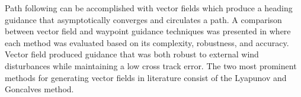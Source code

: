 \documentclass[conf]{new-aiaa}
\begin{document}
 


%
%


 
%
%

	
Path following can be accomplished with vector fields which produce a heading guidance that asymptotically converges and circulates a path. A comparison between vector field and waypoint guidance techniques was presented in \cite{sujit_unmanned_2014} where each method was evaluated based on its complexity, robustness, and accuracy. Vector field produced guidance that was both robust to external wind disturbances while maintaining a low cross track error. The two most prominent methods for generating vector fields in literature consist of the Lyapunov \cite{nelson_cooperative_2005,nelson_vector_2006,nelson_vector_2007,frew_cooperative_2007,miao_orthogonal_2016,griffiths_vector_2006} and Goncalves \cite{goncalves_artificial_2009,goncalves_circulation_2010,goncalves_vector_2010,gerlach_autonomous_2014} method. \\
\end{document}
